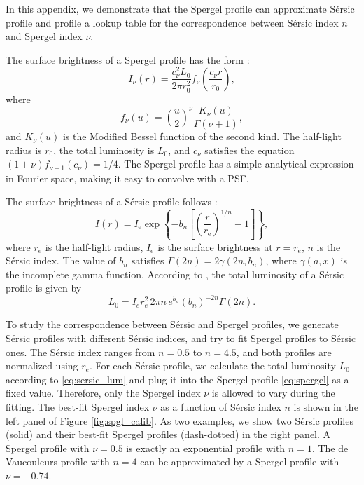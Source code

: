 \documentclass[twocolumn,astrosymb,twocolappendix]{aastex631}
\newcommand{\sersic}{S\'ersic}
\begin{document}
\begin{CJK*}{UTF8}{gbsn}
In this appendix, we demonstrate that the Spergel profile can approximate \sersic{} profile and profile a lookup table for the correspondence between \sersic{} index $n$ and Spergel index $\nu$.

The surface brightness of a Spergel profile has the form \citep{Spergel2010}:
\begin{equation}
    \label{eq:spergel}
    I_\nu(r) = \frac{c_{\nu}^{2} L_{0}}{2\pi r_{0}^{2}} f_{\nu}\left(\frac{c_{\nu} r}{r_{0}}\right),
\end{equation}
where 
\begin{equation}
    f_{\nu}(u)=\left(\frac{u}{2}\right)^{\nu} \frac{K_{\nu}(u)}{\Gamma(\nu+1)},
\end{equation}
and $K_\nu(u)$ is the Modified Bessel function of the second kind. The half-light radius is $r_0$, the total luminosity is $L_0$, and $c_\nu$ satisfies the equation $(1 + \nu)f_{\nu + 1}(c_\nu) = 1/4$. The Spergel profile has a simple analytical expression in Fourier space, making it easy to convolve with a PSF.

The surface brightness of a \sersic{} profile follows \citep{Sersic1963,Graham2005}:
\begin{equation}\label{eq:sersic}
    I(r)=I_{\mathrm{e}} \exp \left\{-b_{n}\left[\left(\frac{r}{r_{\mathrm{e}}}\right)^{1 / n}-1\right]\right\},
\end{equation}
where $r_e$ is the half-light radius, $I_e$ is the surface brightness at $r=r_e$, $n$ is the \sersic{} index. The value of $b_n$ satisfies $\Gamma(2 n)=2 \gamma\left(2 n, b_{n}\right)$, where $\gamma(a, x)$ is the incomplete gamma function. According to \citet{Graham2005}, the total luminosity of a \sersic{} profile is given by 
\begin{equation}\label{eq:sersic_lum}
    L_0 = I_{e} r_{e}^{2}\, 2 \pi n\, e^{b_{n}} \left(b_{n}\right)^{-2 n} \Gamma(2 n).
\end{equation}

To study the correspondence between \sersic{} and Spergel profiles, we generate \sersic{} profiles with different \sersic{} indices, and try to fit Spergel profiles to \sersic{} ones. The \sersic{} index ranges from $n=0.5$ to $n=4.5$, and both profiles are normalized using $r_e$. For each \sersic{} profile, we calculate the total luminosity $L_0$ according to \eqref{eq:sersic_lum} and plug it into the Spergel profile \eqref{eq:spergel} as a fixed value. Therefore, only the Spergel index $\nu$ is allowed to vary during the fitting. The best-fit Spergel index $\nu$ as a function of \sersic{} index $n$ is shown in the left panel of Figure \ref{fig:spgl_calib}. As two examples, we show two \sersic{} profiles (solid) and their best-fit Spergel profiles (dash-dotted) in the right panel. A Spergel profile with $\nu=0.5$ is exactly an exponential profile with $n=1$. The de Vaucouleurs profile \citep{deVaucouleurs1948} with $n=4$ can be approximated by a Spergel profile with $\nu=-0.74$. 


\end{CJK*}
\end{document}
